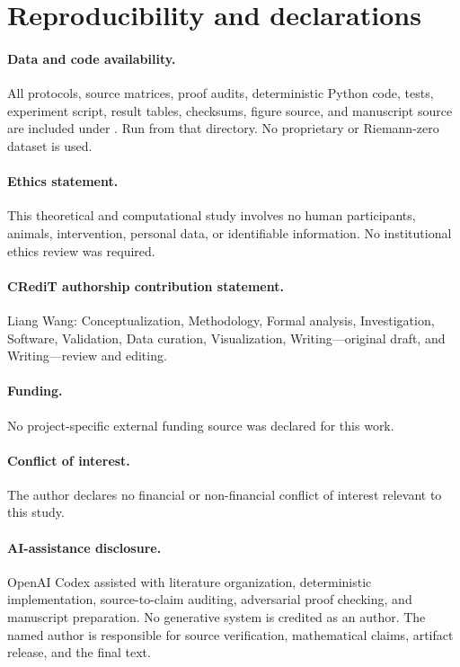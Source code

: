 \documentclass[11pt]{article}
\theoremstyle{definition}
\theoremstyle{remark}
\begin{document}
\section*{Reproducibility and declarations}

\paragraph{Data and code availability.}
All protocols, source matrices, proof audits, deterministic Python code,
tests, experiment script, result tables, checksums, figure source, and
manuscript source are included under
.  Run
 from that directory.  No proprietary or
Riemann-zero dataset is used.

\paragraph{Ethics statement.}
This theoretical and computational study involves no human participants,
animals, intervention, personal data, or identifiable information.  No
institutional ethics review was required.

\paragraph{CRediT authorship contribution statement.}
Liang Wang: Conceptualization, Methodology, Formal analysis, Investigation,
Software, Validation, Data curation, Visualization, Writing---original draft,
and Writing---review and editing.

\paragraph{Funding.}
No project-specific external funding source was declared for this work.

\paragraph{Conflict of interest.}
The author declares no financial or non-financial conflict of interest
relevant to this study.

\paragraph{AI-assistance disclosure.}
OpenAI Codex assisted with literature organization, deterministic
implementation, source-to-claim auditing, adversarial proof checking, and
manuscript preparation.  No generative system is credited as an author.  The
named author is responsible for source verification, mathematical claims,
artifact release, and the final text.
\end{document}
